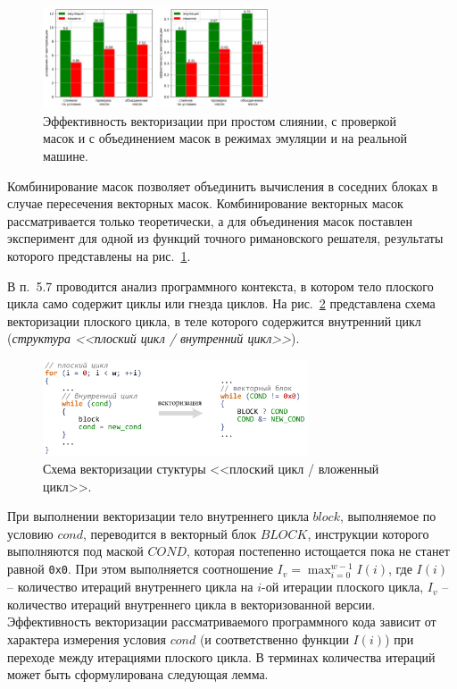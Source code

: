 \documentclass[a4paper,14pt]{extarticle}                     %
\theoremstyle{plain}                                         %
\begin{document}
\begin{figure}[!ht]
\centering
\includegraphics[width=0.6\textwidth]{./pics/text_4_vec_comb_mask/res.png}
\singlespacing
\caption{Эффективность векторизации при простом слиянии, с проверкой масок и с объединением масок в режимах эмуляции и на реальной машине.}
\label{fig:text_4_vec_comb_mask_res}
\end{figure}

Комбинирование масок позволяет объединить вычисления в соседних блоках в случае пересечения векторных масок.
Комбинирование векторных масок рассматривается только теоретически, а для объединения масок поставлен эксперимент для одной из функций точного римановского решателя, результаты которого представлены на рис.~\ref{fig:text_4_vec_comb_mask_res}.


В п.~5.7 проводится анализ программного контекста, в котором тело плоского цикла само содержит циклы или гнезда циклов.
На рис.~\ref{fig:vec_flat_loop_nest} представлена схема векторизации плоского цикла, в теле которого содержится внутренний цикл (\textit{структура <<плоский цикл / внутренний цикл>>}).

\begin{figure}[!ht]
\centering
\includegraphics[width=0.7\textwidth]{./fig/vec_flat_loop_nest.pdf}
\singlespacing
\caption{Схема векторизации стуктуры <<плоский цикл / вложенный цикл>>.}
\label{fig:vec_flat_loop_nest}
\end{figure}

При выполнении векторизации тело внутреннего цикла $block$, выполняемое по условию $cond$, переводится в векторный блок $BLOCK$, инструкции которого выполняются под маской $COND$, которая постепенно истощается пока не станет равной \texttt{0x0}.
При этом выполняется соотношение $I_v = \max_{i = 0}^{w - 1}{I(i)}$, где $I(i)$ -- количество итераций внутреннего цикла на $i$-ой итерации плоского цикла, $I_v$ -- количество итераций внутреннего цикла в векторизованной версии.
Эффективность векторизации рассматриваемого программного кода зависит от характера измерения условия $cond$ (и соответственно функции $I(i)$) при переходе между итерациями плоского цикла.
В терминах количества итераций может быть сформулирована следующая лемма.
\end{document}
